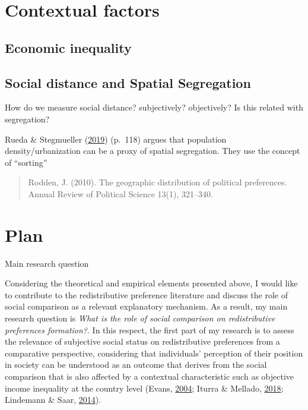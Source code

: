 \documentclass[
  12pt,
]{book}
\begin{document}
\hypertarget{contextual-factors}{%
\chapter{Contextual factors}\label{contextual-factors}}

\hypertarget{economic-inequality}{%
\section{Economic inequality}\label{economic-inequality}}

\hypertarget{social-distance-and-spatial-segregation}{%
\section{Social distance and Spatial Segregation}\label{social-distance-and-spatial-segregation}}

How do we measure social distance? subjectively? objectively? Is this related with segregation?

Rueda \& Stegmueller (\protect\hyperlink{ref-rueda_who_2019}{2019}) (p.~118) argues that population density/urbanization can be a proxy of spatial segregation. They use the concept of ``sorting''

\begin{quote}
Rodden, J. (2010). The geographic distribution of political preferences. Annual Review of Political Science 13(1), 321--340.
\end{quote}

\hypertarget{plan}{%
\chapter{Plan}\label{plan}}

Main research question

Considering the theoretical and empirical elements presented above, I would like to contribute to the redistributive preference literature and discuss the role of social comparison as a relevant explanatory mechanism. As a result, my main research question is \emph{What is the role of social comparison on redistributive preferences formation?}. In this respect, the first part of my research is to assess the relevance of subjective social status on redistributive preferences from a comparative perspective, considering that individuals' perception of their position in society can be understood as an outcome that derives from the social comparison that is also affected by a contextual characteristic such as objective income inequality at the country level (Evans, \protect\hyperlink{ref-Evans2004}{2004}; Iturra \& Mellado, \protect\hyperlink{ref-IturraMellado2019}{2018}; Lindemann \& Saar, \protect\hyperlink{ref-Lindemann2014}{2014}).
\end{document}
